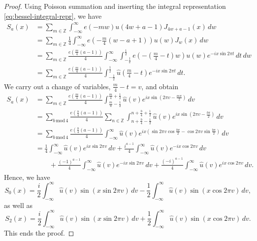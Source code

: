 \documentclass[reqno, 12pt]{amsart}
\begin{document}
\begin{proof}
Using Poisson summation and inserting the integral representation \eqref{eq:bessel-integral-repr}, we have
\begin{align*}
  S_a(x) &= \sum_{m \in \mathbb{Z}} \int_{-\infty}^\infty e(-mw) u(4w+a-1) J_{4w+a-1}(x) \,dw \\
  &= \sum_{m \in \mathbb{Z}} \frac{1}{4} \int_{-\infty}^\infty e \left(-\frac{m}{4}(w-a+1) \right) u(w) J_{w}(x) \,dw \\
  &= \sum_{m \in \mathbb{Z}} \frac{e(\frac{m}{4}(a-1))}{4} \int_{-\infty}^\infty \int_{-\frac{1}{2}}^{\frac{1}{2}} e\left(-\left(\frac{m}{4}-t\right)w \right) u(w) e^{-ix \sin 2\pi t} \,dt \,dw \\
  &= \sum_{m \in \mathbb{Z}} \frac{e(\frac{m}{4}(a-1))}{4} \int_{-\frac{1}{2}}^{\frac{1}{2}} \hat{u} \left( \frac{m}{4}-t \right) e^{-ix \sin 2\pi t} \,dt.
\end{align*}
We {carry out a change of }variables, $\frac{m}{4} - t = v$, and obtain
\begin{align*}
  S_a{(x)} &= \sum_{m \in \mathbb{Z}} \frac{e(\frac{m}{4}(a-1))}{4} \int_{\frac{m}{4} - \frac{1}{2}}^{\frac{m}{4}+\frac{1}{2}} \hat{u}(v) e^{ix \sin (2\pi v - \frac{m \pi}{2})} \,dv \\
  &= \sum_{b \, \mathrm{mod} \, 4} \frac{e(\frac{b}{4}(a-1))}{4} \sum_{n \in \mathbb{Z}} \int_{n+ \frac{b}{4} - \frac{1}{2}}^{n + \frac{b}{4}+\frac{1}{2}} \hat{u}(v) e^{ix \sin (2\pi v - \frac{b \pi}{2})} \,dv \\
  &= \sum_{b \, \mathrm{mod} \, 4} \frac{e(\frac{b}{4}(a-1))}{4} \int_{-\infty}^\infty \hat{u}(v) e^{ix (\sin 2\pi v \cos \frac{b\pi}{2} - \cos 2\pi v \sin \frac{b\pi}{2})} \,dv \\
  &= \frac{1}{4} \int_{-\infty}^\infty \hat{u}(v) e^{ix \sin 2\pi v } \,dv + \frac{i^{a-1}}{4} \int_{-\infty}^\infty \hat{u}(v) e^{-ix \cos 2\pi v} \,dv \\
  &\qquad + \frac{(-1)^{a-1}}{4} \int_{-\infty}^\infty \hat{u}(v) e^{-ix \sin 2\pi v} \,dv + \frac{(-i)^{a-1}}{4} \int_{-\infty}^\infty \hat{u}(v) e^{ix \cos 2\pi v} \,dv.
\end{align*}
Hence, we have
\[ S_0{(x)} = \frac{i}{2} \int_{-\infty}^\infty \hat{u}(v) \sin (x \sin 2\pi v) \,dv - \frac{1}{2} \int_{-\infty}^\infty \hat{u}(v) \sin(x \cos 2\pi v) \,dv, \]
as well as
\[ S_2{(x)} = \frac{i}{2} \int_{-\infty}^\infty \hat{u}(v) \sin (x \sin 2\pi v) \,dv + \frac{1}{2} \int_{-\infty}^\infty \hat{u}(v) \sin(x \cos 2\pi v) \,dv. \]
This ends the proof.
\end{proof}
\end{document}
